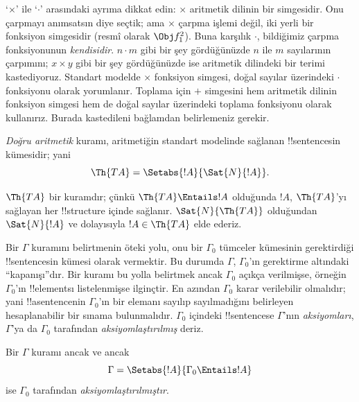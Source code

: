 \documentclass[../../../include/open-logic-section]{subfiles}
\begin{document}
`$\times$' ile `$\cdot$' arasındaki ayrıma dikkat edin: $\times$ aritmetik
dilinin bir simgesidir. Onu çarpmayı anımsatsın diye seçtik; ama $\times$
çarpma işlemi değil, iki yerli bir fonksiyon simgesidir (resmî olarak
$\Obj f^2_1$). Buna karşılık $\cdot$, bildiğimiz çarpma fonksiyonunun
\emph{kendisidir}. $n \cdot m$ gibi bir şey gördüğünüzde $n$ ile $m$
sayılarının çarpımını; $x \times y$ gibi bir şey gördüğünüzde ise aritmetik
dilindeki bir terimi kastediyoruz. Standart modelde $\times$ fonksiyon
simgesi, doğal sayılar üzerindeki $\cdot$ fonksiyonu olarak yorumlanır.
Toplama için $+$ simgesini hem aritmetik dilinin fonksiyon simgesi hem de
doğal sayılar üzerindeki toplama fonksiyonu olarak kullanırız. Burada
kastedileni bağlamdan belirlemeniz gerekir.

\begin{defn}
\emph{Doğru aritmetik} kuramı, aritmetiğin standart modelinde sağlanan
!!{sentence}s{}in kümesidir; yani
\[
\Th{TA} = \Setabs{!A}{\Sat{N}{!A}}.
\]
\end{defn}

$\Th{TA}$ bir kuramdır; çünkü $\Th{TA} \Entails !A$ olduğunda $!A$,
$\Th{TA}$'yı sağlayan her !!{structure} içinde sağlanır. $\Sat{N}{\Th{TA}}$
olduğundan $\Sat{N}{!A}$ ve dolayısıyla $!A \in \Th{TA}$ elde ederiz.

Bir $\Gamma$ kuramını belirtmenin öteki yolu, onu bir $\Gamma_0$ tümceler
kümesinin gerektirdiği !!{sentence}s{}in kümesi olarak vermektir. Bu durumda
$\Gamma$, $\Gamma_0$'ın gerektirme altındaki ``kapanışı''dır. Bir kuramı
bu yolla belirtmek ancak $\Gamma_0$ açıkça verilmişse, örneğin
$\Gamma_0$'ın !!{element}s{}ı listelenmişse ilginçtir. En azından
$\Gamma_0$ karar verilebilir olmalıdır; yani !!a{sentence}{}nin
$\Gamma_0$'ın bir elemanı sayılıp sayılmadığını belirleyen hesaplanabilir
bir sınama bulunmalıdır. $\Gamma_0$ içindeki !!{sentence}s{}e $\Gamma$'nın
\emph{aksiyomları}, $\Gamma$'ya da $\Gamma_0$ tarafından
\emph{aksiyomlaştırılmış} deriz.

\begin{defn}
Bir $\Gamma$ kuramı ancak ve ancak
\[
\Gamma = \Setabs{!A}{\Gamma_0 \Entails !A}
\]
ise $\Gamma_0$ tarafından \emph{aksiyomlaştırılmıştır}.
\end{defn}
\end{document}
